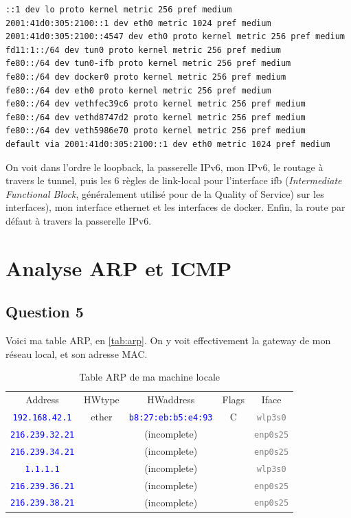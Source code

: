 \documentclass[a4paper,10pt]{article}
\newcommand{\codeword}[1]{\texttt{\textcolor{gray}{#1}}}
\newcommand{\blueword}[1]{\texttt{\textcolor{blue}{#1}}}
\begin{document}
\begin{lstlisting}
::1 dev lo proto kernel metric 256 pref medium
2001:41d0:305:2100::1 dev eth0 metric 1024 pref medium
2001:41d0:305:2100::4547 dev eth0 proto kernel metric 256 pref medium
fd11:1::/64 dev tun0 proto kernel metric 256 pref medium
fe80::/64 dev tun0-ifb proto kernel metric 256 pref medium
fe80::/64 dev docker0 proto kernel metric 256 pref medium
fe80::/64 dev eth0 proto kernel metric 256 pref medium
fe80::/64 dev vethfec39c6 proto kernel metric 256 pref medium
fe80::/64 dev vethd8747d2 proto kernel metric 256 pref medium
fe80::/64 dev veth5986e70 proto kernel metric 256 pref medium
default via 2001:41d0:305:2100::1 dev eth0 metric 1024 pref medium
\end{lstlisting}

On voit dans l'ordre le loopback, la passerelle IPv6, mon IPv6, le routage à travers le tunnel, puis les 6 règles de link-local pour l'interface ifb (\textit{Intermediate Functional Block}, généralement utilisé pour de la Quality of Service) sur les interfaces), mon interface ethernet et les interfaces de docker. Enfin, la route par défaut à travers la passerelle IPv6.

\pagebreak
\section{Analyse ARP et ICMP}

\subsection{Question 5}

Voici ma table ARP, en \autoref{tab:arp}. On y voit effectivement la gateway de mon réseau local, et son adresse MAC.

\begin{table}[ht]
	\centering
	\begin{tabular}{|c|c|c|c|c|}
		\bottomrule
		Address& HWtype& HWaddress& Flags& Iface\\
		\blueword{192.168.42.1}& ether& \blueword{b8:27:eb:b5:e4:93}& C&\codeword{wlp3s0}\\
		\blueword{216.239.32.21}&&(incomplete)&&\codeword{enp0s25}\\
		\blueword{216.239.34.21}&&(incomplete)&&\codeword{enp0s25}\\
		\blueword{1.1.1.1}&&(incomplete)&&\codeword{wlp3s0}\\
		\blueword{216.239.36.21}&&(incomplete)&&\codeword{enp0s25}\\
		\blueword{216.239.38.21}&&(incomplete)&&\codeword{enp0s25}\\
		\toprule
	\end{tabular}
	\caption{Table ARP de ma machine locale}
	\label{tab:arp}
\end{table}
\end{document}

